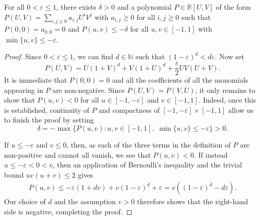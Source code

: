 \documentclass[10pt,a4paper]{amsart}
\def \N {\mathbb{N}}
\def \R {\mathbb{R}}
\def\eps{\varepsilon}
\begin{document}
\begin{lemma}\label{lem2}
    For all $0<\eps \leqslant 1$, there exists $\delta>0$ and a polynomial $P\in\R[U,V]$ of the form $P(U,V)=\sum_{i,j\geqslant 0}a_{i,j}U^iV^j$ with $a_{i,j}\geqslant 0$ for all $i,j\geqslant 0$ such that $P(0,0) = a_{0,0} = 0$ and $P(u,v)\leqslant - \delta$ for all $u,v\in[-1,1]$ with $\min\{u,v\}\leqslant -\eps$.
\end{lemma}

\begin{proof}
    Since $0<\eps\leqslant 1$, we can find $d\in\N$ such that $(1-\eps)^d <  d\eps $. Now set
    \begin{equation*}
        P(U,V) = U(1+V)^d + V(1+U)^d + \frac{\eps}{2}UV(U+V).
    \end{equation*}
It is immediate that $P(0,0) = 0$ and all the coefficients of all the monomials appearing in $P$ are non-negative. Since $P(U,V)=P(V,U)$, it only remains to show that $P(u,v)<0$ for all $u\in[-1,-\eps]$ and $v\in[-1,1]$. Indeed, once this is established, continuity of $P$ and compactness of $[-1,-\eps]\times[-1,1]$ allow us to finish the proof by setting
    \begin{equation*}
         \delta = - \max\{P(u,v):u,v\in[-1,1],\; \min\{u,v\}\leqslant-\eps\} > 0.
    \end{equation*}
    
    If $u\leqslant -\eps$ and $v \leqslant 0$, then, as each of the three terms in the definition of $P$ are non-positive and cannot all vanish, we see that $P(u,v)<0$. If instead $u\leqslant -\eps < 0 < v$, then an application of Bernoulli's inequality and the trivial bound $uv(u+v)\leqslant 2$ gives
    \begin{align*}
        P(u,v)\leqslant -\eps (1+dv) + v(1-\eps )^d + \eps = v ((1-\eps)^d - d\eps).
    \end{align*}
    Our choice of $d$ and the assumption $v>0$ therefore shows that the right-hand side is negative, completing the proof.
\end{proof}
\end{document}
